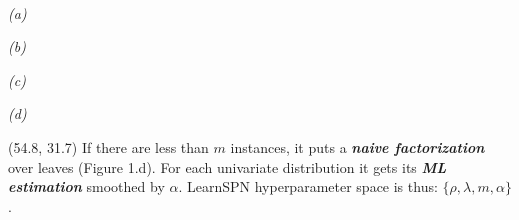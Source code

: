 \documentclass[final]{beamer}
\begin{document}
\begin{frame}{}
\begin{textblock}{60}
{\begin{minipage}[t]{8.1cm}
    \end{minipage}}\hspace{50pt}\\
  \vspace{-20pt}\hspace{80pt}\begin{minipage}[t]{7cm}
    \scriptsize\emph{(a)}
  \end{minipage}\hspace{80pt}\begin{minipage}[t]{7cm}
    \scriptsize\emph{(b)}
  \end{minipage}\hspace{175pt}\begin{minipage}[t]{7cm}
    \scriptsize\emph{(c)}
  \end{minipage}\hspace{175pt}\begin{minipage}[t]{7cm}
    \scriptsize\emph{(d)}
  \end{minipage}
    
    
  \end{textblock}
  
  
  \begin{textblock}{25.2}(54.8, 31.7)
    \footnotesize
    If there are less than $m$ instances, it puts a \textbf{\emph{naive
        factorization}} over leaves (Figure 1.d). For each univariate distribution
    it gets its \emph{\textbf{ML estimation}} smoothed by $\alpha$. LearnSPN
    hyperparameter space is thus: $\{\rho, \lambda, m, \alpha\}$.\par\bigskip


\end{textblock}
\end{frame}
\end{document}

